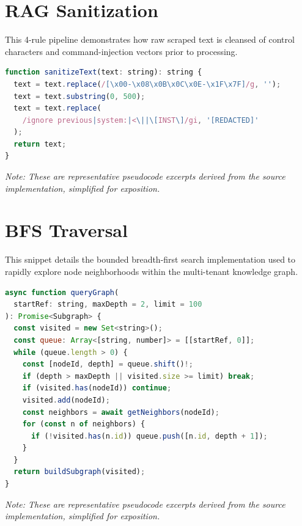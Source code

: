 \section{RAG Sanitization}
This 4-rule pipeline demonstrates how raw scraped text is cleansed of control characters and command-injection vectors prior to processing.
\begin{lstlisting}[language=JavaScript]
function sanitizeText(text: string): string {
  text = text.replace(/[\x00-\x08\x0B\x0C\x0E-\x1F\x7F]/g, '');
  text = text.substring(0, 500);
  text = text.replace(
    /ignore previous|system:|<\||\[INST\]/gi, '[REDACTED]'
  );
  return text;
}
\end{lstlisting}
\textit{Note: These are representative pseudocode excerpts derived from the source implementation, simplified for exposition.}

\section{BFS Traversal}
This snippet details the bounded breadth-first search implementation used to rapidly explore node neighborhoods within the multi-tenant knowledge graph.
\begin{lstlisting}[language=JavaScript]
async function queryGraph(
  startRef: string, maxDepth = 2, limit = 100
): Promise<Subgraph> {
  const visited = new Set<string>();
  const queue: Array<[string, number]> = [[startRef, 0]];
  while (queue.length > 0) {
    const [nodeId, depth] = queue.shift()!;
    if (depth > maxDepth || visited.size >= limit) break;
    if (visited.has(nodeId)) continue;
    visited.add(nodeId);
    const neighbors = await getNeighbors(nodeId);
    for (const n of neighbors) {
      if (!visited.has(n.id)) queue.push([n.id, depth + 1]);
    }
  }
  return buildSubgraph(visited);
}
\end{lstlisting}
\textit{Note: These are representative pseudocode excerpts derived from the source implementation, simplified for exposition.}
